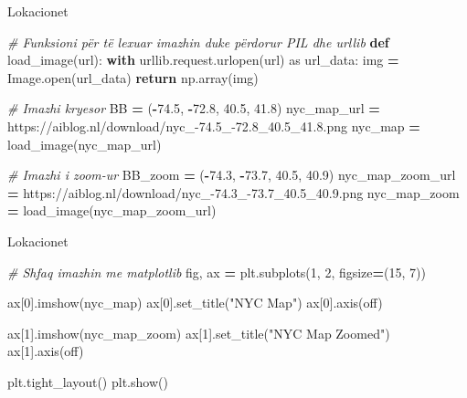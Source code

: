 \documentclass[
  ignorenonframetext,
]{beamer}
\newenvironment{Shaded}{\begin{snugshade}}{\end{snugshade}}
\newcommand{\BuiltInTok}[1]{#1}
\newcommand{\CommentTok}[1]{\textcolor[rgb]{0.56,0.35,0.01}{\textit{#1}}}
\newcommand{\ControlFlowTok}[1]{\textcolor[rgb]{0.13,0.29,0.53}{\textbf{#1}}}
\newcommand{\DecValTok}[1]{\textcolor[rgb]{0.00,0.00,0.81}{#1}}
\newcommand{\FloatTok}[1]{\textcolor[rgb]{0.00,0.00,0.81}{#1}}
\newcommand{\ImportTok}[1]{#1}
\newcommand{\KeywordTok}[1]{\textcolor[rgb]{0.13,0.29,0.53}{\textbf{#1}}}
\newcommand{\NormalTok}[1]{#1}
\newcommand{\OperatorTok}[1]{\textcolor[rgb]{0.81,0.36,0.00}{\textbf{#1}}}
\newcommand{\StringTok}[1]{\textcolor[rgb]{0.31,0.60,0.02}{#1}}
\begin{document}
\begin{frame}[fragile]{Lokacionet}
\begin{Shaded}
\begin{Highlighting}[]
\CommentTok{\# Funksioni për të lexuar imazhin duke përdorur PIL dhe urllib}
\KeywordTok{def}\NormalTok{ load\_image(url):}
    \ControlFlowTok{with}\NormalTok{ urllib.request.urlopen(url) }\ImportTok{as}\NormalTok{ url\_data:}
\NormalTok{        img }\OperatorTok{=}\NormalTok{ Image.}\BuiltInTok{open}\NormalTok{(url\_data)}
        \ControlFlowTok{return}\NormalTok{ np.array(img)}

\CommentTok{\# Imazhi kryesor}
\NormalTok{BB }\OperatorTok{=}\NormalTok{ (}\OperatorTok{{-}}\FloatTok{74.5}\NormalTok{, }\OperatorTok{{-}}\FloatTok{72.8}\NormalTok{, }\FloatTok{40.5}\NormalTok{, }\FloatTok{41.8}\NormalTok{)}
\NormalTok{nyc\_map\_url }\OperatorTok{=} \StringTok{\textquotesingle{}https://aiblog.nl/download/nyc\_{-}74.5\_{-}72.8\_40.5\_41.8.png\textquotesingle{}}
\NormalTok{nyc\_map }\OperatorTok{=}\NormalTok{ load\_image(nyc\_map\_url)}

\CommentTok{\# Imazhi i zoom{-}ur}
\NormalTok{BB\_zoom }\OperatorTok{=}\NormalTok{ (}\OperatorTok{{-}}\FloatTok{74.3}\NormalTok{, }\OperatorTok{{-}}\FloatTok{73.7}\NormalTok{, }\FloatTok{40.5}\NormalTok{, }\FloatTok{40.9}\NormalTok{)}
\NormalTok{nyc\_map\_zoom\_url }\OperatorTok{=} \StringTok{\textquotesingle{}https://aiblog.nl/download/nyc\_{-}74.3\_{-}73.7\_40.5\_40.9.png\textquotesingle{}}
\NormalTok{nyc\_map\_zoom }\OperatorTok{=}\NormalTok{ load\_image(nyc\_map\_zoom\_url)}
\end{Highlighting}
\end{Shaded}
\end{frame}

\begin{frame}[fragile]{Lokacionet}
\protect\hypertarget{lokacionet-6}{}

\begin{Shaded}
\begin{Highlighting}[]
\CommentTok{\# Shfaq imazhin me matplotlib}
\NormalTok{fig, ax }\OperatorTok{=}\NormalTok{ plt.subplots(}\DecValTok{1}\NormalTok{, }\DecValTok{2}\NormalTok{, figsize}\OperatorTok{=}\NormalTok{(}\DecValTok{15}\NormalTok{, }\DecValTok{7}\NormalTok{))}

\NormalTok{ax[}\DecValTok{0}\NormalTok{].imshow(nyc\_map)}
\NormalTok{ax[}\DecValTok{0}\NormalTok{].set\_title(}\StringTok{"NYC Map"}\NormalTok{)}
\NormalTok{ax[}\DecValTok{0}\NormalTok{].axis(}\StringTok{\textquotesingle{}off\textquotesingle{}}\NormalTok{)}

\NormalTok{ax[}\DecValTok{1}\NormalTok{].imshow(nyc\_map\_zoom)}
\NormalTok{ax[}\DecValTok{1}\NormalTok{].set\_title(}\StringTok{"NYC Map Zoomed"}\NormalTok{)}
\NormalTok{ax[}\DecValTok{1}\NormalTok{].axis(}\StringTok{\textquotesingle{}off\textquotesingle{}}\NormalTok{)}

\NormalTok{plt.tight\_layout()}
\NormalTok{plt.show()}
\end{Highlighting}
\end{Shaded}
\end{frame}
\end{document}
